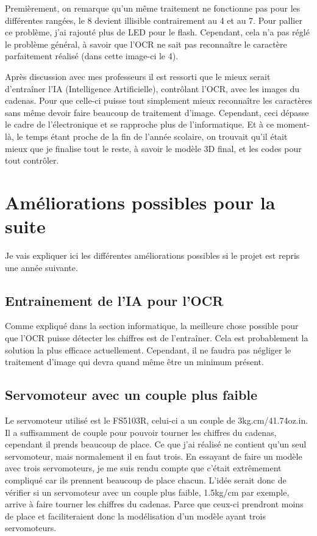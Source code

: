 \documentclass[twoside]{article}
\begin{document}
\begin{multicols}{2}
Premièrement, on remarque qu'un même traitement ne fonctionne pas pour les différentes rangées, le 8 devient illisible contrairement au 4 et au 7. Pour pallier ce problème, j'ai rajouté plus de LED pour le flash. Cependant, cela n'a pas réglé le problème général, à savoir que l'OCR ne sait pas reconnaître le caractère parfaitement réalisé (dans cette image-ci le 4).

Après discussion avec mes professeurs il est ressorti que le mieux serait d'entraîner l'IA (Intelligence Artificielle), contrôlant l'OCR, avec les images du cadenas. Pour que celle-ci puisse tout simplement mieux reconnaître les caractères sans même devoir faire beaucoup de traitement d'image. Cependant, ceci dépasse le cadre de l'électronique et se rapproche plus de l'informatique. Et à ce moment-là, le temps étant proche de la fin de l'année scolaire, on trouvait qu'il était mieux que je finalise tout le reste, à savoir le modèle 3D final, et les codes pour tout contrôler.

\section{Améliorations possibles pour la suite}
Je vais expliquer ici les différentes améliorations possibles si le projet est repris une année suivante.

\subsection{Entrainement de l'IA pour l'OCR}

Comme expliqué dans la section informatique, la meilleure chose possible pour que l'OCR puisse détecter les chiffres est de l'entraîner. Cela est probablement la solution la plus efficace actuellement. Cependant, il ne faudra pas négliger le traitement d'image qui devra quand même être un minimum présent.

\subsection{Servomoteur avec un couple plus faible}

Le servomoteur utilisé est le FS5103R, celui-ci a un couple de 3kg.cm/41.74oz.in. Il a suffisamment de couple pour pouvoir tourner les chiffres du cadenas, cependant il prends beaucoup de place. Ce que j'ai réalisé ne contient qu'un seul servomoteur, mais normalement il en faut trois. En essayant de faire un modèle avec trois servomoteurs, je me suis rendu compte que c'était extrêmement compliqué car ils prennent beaucoup de place chacun. L'idée serait donc de vérifier si un servomoteur avec un couple plus faible, 1.5kg/cm par exemple, arrive à faire tourner les chiffres du cadenas. Parce que ceux-ci prendront moins de place et faciliteraient donc la modélisation d'un modèle ayant trois servomoteurs.


\end{multicols}
\end{document}
